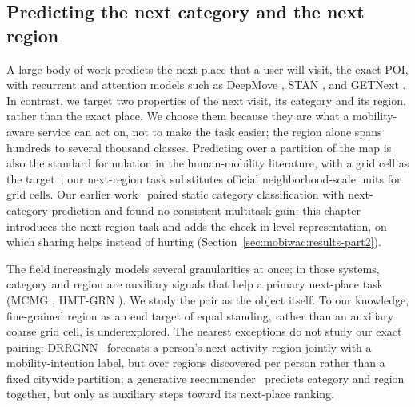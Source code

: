 \subsection{Predicting the next category and the next region}
\label{sec:mobiwac:related-tasks}
A large body of work predicts the next place that a user will visit, the exact POI,
with recurrent and attention models such as DeepMove \cite{feng2018deepmove}, STAN
\cite{luo2021stan}, and GETNext \cite{yang2022getnext}. In contrast, we target two properties of the next visit, its category and its
region, rather than the exact place. We choose them because they are
what a mobility-aware service can act on, not to make the task easier; the region
alone spans hundreds to several thousand classes. Predicting
over a partition of the map is also the standard formulation in the human-mobility
literature, with a grid cell as the target~\cite{luca2021mobilitysurvey}; our
next-region task substitutes official neighborhood-scale units for grid cells. Our earlier
work~\cite{silva2025mtlnet} paired static category classification with next-category prediction
and found no consistent multitask gain; this chapter introduces the next-region task and adds the check-in-level
representation, on which sharing helps instead of hurting (Section~\ref{sec:mobiwac:results-part2}).

The field
increasingly models several granularities at once; in those systems, category and
region are auxiliary signals that help a primary next-place task
(MCMG \cite{sun2024mcmg}, HMT-GRN \cite{Lim2022}).
We study the pair as the object itself. To our knowledge, fine-grained region as an
end target of equal standing, rather than an auxiliary coarse grid cell, is
underexplored.
The nearest exceptions do not study our exact pairing:
DRRGNN~\cite{zhu2022drrgnn} forecasts a person's next activity region jointly
with a mobility-intention label, but over regions discovered per person rather
than a fixed citywide partition; a generative recommender~\cite{sun2025kgtb}
predicts category and region together, but only as auxiliary steps toward its
next-place ranking.

